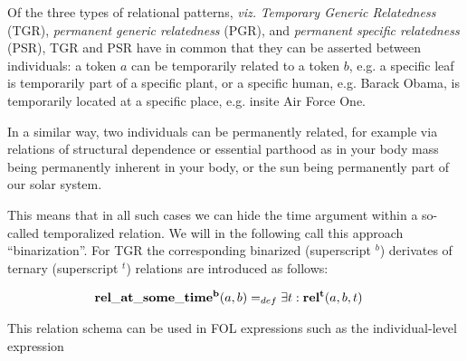 
Of the three types of relational patterns, \emph{viz.} \emph{Temporary Generic Relatedness} (TGR), \emph{permanent generic relatedness} (PGR), and \emph{permanent specific relatedness} (PSR), TGR and PSR have in common that they can be asserted between individuals: a token $a$ can be temporarily related to a token $b$, e.g. 
a specific leaf is temporarily part of a specific plant, or a specific human, e.g. Barack Obama, 
is temporarily located at a specific place, e.g. insite Air Force One.

In a similar way, two individuals can be permanently related, for example via relations of structural dependence or essential parthood as in 
your body mass being permanently inherent in your body, or the sun being permanently part of our solar system.

This means that in all such cases  we can hide the time argument within a so-called temporalized relation. We will in the following call this approach ``binarization''. 
For TGR the corresponding binarized (superscript $^b$) derivates of ternary (superscript $^t$) relations are introduced as follows:  

\begin{equation}
\begin{split}
\mathrm{\mathbf{rel\_at\_some\_time^b}} (a,b) =_{def}&\; \exists t: \mathrm{\mathbf{rel^t}}(a,b,t)  
\end{split}
\label{eq:temporarily:ind}
\end{equation}

This relation schema can be used in FOL expressions such as the individual-level expression

